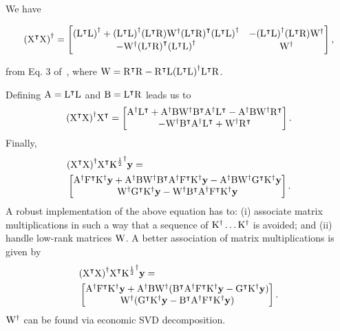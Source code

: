 \documentclass[twocolumn,draft]{article}
\begin{document}
We have

\begin{strip}
	\begin{equation*}
		\pinv{(\trans{\rmX}\rmX)} =
		\begin{bmatrix}
			\pinv{(\trans{\rmL}\rmL)} + \pinv{(\trans{\rmL}\rmL)} (\trans{\rmL}\rmR)
				\pinv{\rmW} \trans{(\trans{\rmL}\rmR)} \pinv{(\trans{\rmL}\rmL)}
				& - \pinv{(\trans{\rmL}\rmL)} (\trans{\rmL}\rmR)
				\pinv{\rmW} \\
			- \pinv{\rmW} \trans{(\trans{\rmL}\rmR)}
			\pinv{(\trans{\rmL}\rmL)} & \pinv{\rmW}
		\end{bmatrix},
	\end{equation*}
\end{strip}
from Eq. 3 of~\cite{rohde1965generalized}, where
$\rmW = \trans{\rmR}\rmR - \trans{\rmR}\rmL\pinv{(\trans{\rmL}\rmL)}
\trans{\rmL}\rmR$.

Defining $\rmA = \trans{\rmL}\rmL$ and $\rmB = \trans{\rmL}\rmR$ leads us to
\begin{equation*}
	\pinv{(\trans{\rmX}\rmX)}\trans{\rmX} =
		\begin{bmatrix}
			\pinv{\rmA}\trans{\rmL}
			+ \pinv{\rmA}\rmB\pinv{\rmW}\trans{\rmB}\pinv{\rmA}\trans{\rmL}
			-\pinv{\rmA}\rmB\pinv{\rmW}\trans{\rmR}\\
			-\pinv{\rmW}\trans{\rmB}\pinv{\rmA}\trans{\rmL}
			+ \pinv{\rmW}\trans{\rmR}
		\end{bmatrix}.
\end{equation*}
Finally,
\begin{align*}
	&\pinv{(\trans{\rmX}\rmX)}\trans{\rmX} \pinv{\rmK^{\haf}}\bfy = \\
	&\begin{bmatrix}
		\pinv{\rmA}\trans{\rmF}\pinv{\rmK}\bfy
		+ \pinv{\rmA}\rmB\pinv{\rmW}\trans{\rmB}\pinv{\rmA}\trans{\rmF}\pinv{\rmK}\bfy
		-\pinv{\rmA}\rmB\pinv{\rmW}\trans{\rmG}\pinv{\rmK}\bfy \\
		\pinv{\rmW}\trans{\rmG}\pinv{\rmK}\bfy
		-\pinv{\rmW}\trans{\rmB}\pinv{\rmA}\trans{\rmF}\pinv{\rmK}\bfy
	\end{bmatrix}.
\end{align*}
A robust implementation of the above equation has to:
(i) associate matrix multiplications in such a way that a sequence of
$\pinv{\rmK}\dots\pinv{\rmK}$ is avoided;
and (ii) handle low-rank matrices $\rmW$.
A better association of matrix multiplications is given by
\begin{align*}
	&\pinv{(\trans{\rmX}\rmX)}\trans{\rmX} \pinv{\rmK^{\haf}}\bfy = \\
	&\begin{bmatrix}
		\pinv{\rmA}\trans{\rmF}\pinv{\rmK}\bfy
		+ \pinv{\rmA}\rmB\pinv{\rmW}(\trans{\rmB}\pinv{\rmA}\trans{\rmF}\pinv{\rmK}
		\bfy-\trans{\rmG}\pinv{\rmK}\bfy) \\
		\pinv{\rmW}(\trans{\rmG}\pinv{\rmK}\bfy
		-\trans{\rmB}\pinv{\rmA}\trans{\rmF}\pinv{\rmK}\bfy)
	\end{bmatrix}.
\end{align*}
$\pinv{\rmW}$ can be found via economic SVD decomposition.
\end{document}
